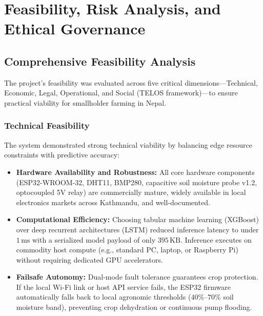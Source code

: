 \documentclass[12pt, a4paper]{article}
\begin{document}
\section{Feasibility, Risk Analysis, and Ethical Governance}
\label{app:feasibility}

\subsection{Comprehensive Feasibility Analysis}
\label{app:feas}

The project's feasibility was evaluated across five critical dimensions—Technical, Economic, Legal, Operational, and Social (TELOS framework)—to ensure practical viability for smallholder farming in Nepal.

\subsubsection{Technical Feasibility}
The system demonstrated strong technical viability by balancing edge resource constraints with predictive accuracy:
\begin{itemize}[noitemsep]
    \item \textbf{Hardware Availability and Robustness:} All core hardware components (ESP32-WROOM-32, DHT11, BMP280, capacitive soil moisture probe v1.2, optocoupled 5V relay) are commercially mature, widely available in local electronics markets across Kathmandu, and well-documented.
    \item \textbf{Computational Efficiency:} Choosing tabular machine learning (XGBoost) over deep recurrent architectures (LSTM) reduced inference latency to under $1\,\text{ms}$ with a serialized model payload of only $395\,\text{KB}$. Inference executes on commodity host compute (e.g., standard PC, laptop, or Raspberry Pi) without requiring dedicated GPU accelerators.
    \item \textbf{Failsafe Autonomy:} Dual-mode fault tolerance guarantees crop protection. If the local Wi-Fi link or host API service fails, the ESP32 firmware automatically falls back to local agronomic thresholds ($40\%\text{--}70\%$ soil moisture band), preventing crop dehydration or continuous pump flooding.
\end{itemize}
\end{document}
